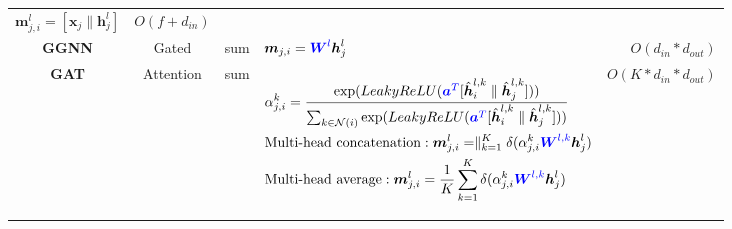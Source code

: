 \begin{table}
\begin{footnotesize}
\begin{tabular}{ccp{8em}p{22em}r}
			$\boldsymbol{m}_{j, i}^l = [\boldsymbol{x}_j \parallel \boldsymbol{h}_j^l]$                                               &
			$O(f+d_{in})$                                                                                                               \\
			\textbf{GGNN}                                                                                                             &
			Gated                                                                                                                     &
			sum                                                                                                                       &
			$\boldsymbol{m}_{j, i} = \textcolor{blue}{\boldsymbol{W}^l} \boldsymbol{h}_j^l$                                           &
			$O(d_{in} * d_{out})$                                                                                                       \\
			\textbf{GAT}                                                                                                              &
			Attention                                                                                                                 &
			sum                                                                                                                       &
			\begin{scriptsize}
				$\begin{aligned}[t]
						 & \alpha_{j, i}^k = \frac {\exp(LeakyReLU(\textcolor{blue}{\boldsymbol{a}^T} [\hat{\boldsymbol{h}}^{l,k}_i \parallel \hat{\boldsymbol{h}}^{l,k}_j] ))} {\sum_{k \in \mathcal{N}(i)}\exp(LeakyReLU(\textcolor{blue}{\boldsymbol{a}^T} [\hat{\boldsymbol{h}}^{l,k}_i \parallel \hat{\boldsymbol{h}}^{l,k}_j] ))} \\
						 & \text{Multi-head concatenation}: \boldsymbol{m}_{j, i}^l = \parallel_{k=1}^K \delta(\alpha_{j, i}^k \textcolor{blue}{\boldsymbol{W}^{l,k}} \boldsymbol{h}_j^{l})                                                                                                                                             \\
						 & \text{Multi-head average}: \boldsymbol{m}_{j, i}^l = \frac{1}{K} \sum_{k=1}^K \delta(\alpha_{j, i}^k \textcolor{blue}{\boldsymbol{W}^{l,k}} \boldsymbol{h}_j^{l})
					\end{aligned}$
			\end{scriptsize}                                                                                             &
			$O(K * d_{in} * d_{out})$                                                                                                   \\

\end{tabular}
\end{footnotesize}
\end{table}
